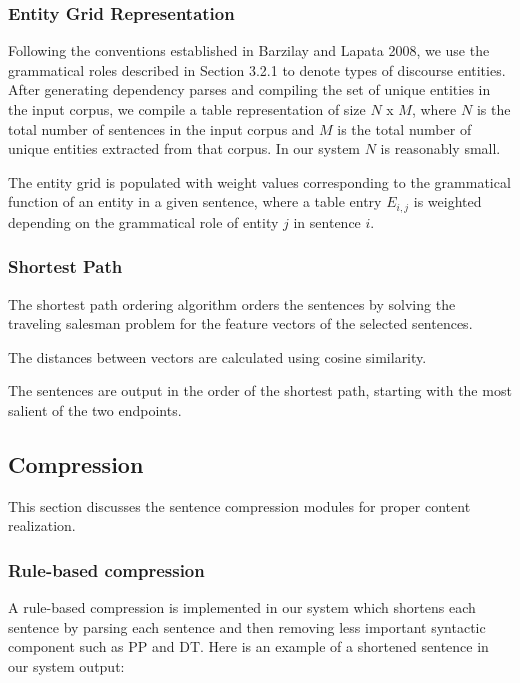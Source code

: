 \documentclass[11pt]{article}
\begin{document}
\subsubsection{Entity Grid Representation}
Following the conventions established in Barzilay and Lapata 2008, we use the grammatical roles described in Section 3.2.1 to denote types of discourse entities. After generating dependency parses and compiling the set of unique entities in the input corpus, we compile a table representation of size $N$ x $M$, where $N$ is the total number of sentences in the input corpus and $M$ is the total number of unique entities extracted from that corpus. In our system $N$ is reasonably small.

The entity grid is populated with weight values corresponding to the grammatical function of an entity in a given sentence, where a table entry $E_{i,j}$ is weighted depending on the grammatical role of entity $j$ in sentence $i$. 


\subsubsection{Shortest Path}
The shortest path ordering algorithm orders the sentences by solving the traveling salesman problem for the feature vectors of the selected sentences. 

The distances between vectors are calculated using cosine similarity.

The sentences are output in the order of the shortest path, starting with the most salient of the two endpoints.

\subsection{Compression}
This section discusses the sentence compression modules for proper content realization.

\subsubsection{Rule-based compression}
A rule-based compression is implemented in our system which shortens each sentence by parsing each sentence and then removing less important syntactic component such as PP and DT. Here is an example of a shortened sentence in our system output:
\\
\\
\end{document}
